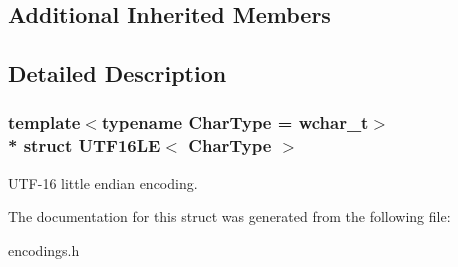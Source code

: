 \subsection*{Additional Inherited Members}


\subsection{Detailed Description}
\subsubsection*{template$<$typename Char\+Type = wchar\+\_\+t$>$\\*
struct U\+T\+F16\+L\+E$<$ Char\+Type $>$}

U\+T\+F-\/16 little endian encoding. 

The documentation for this struct was generated from the following file\+:\begin{DoxyCompactItemize}
\item 
encodings.\+h\end{DoxyCompactItemize}
